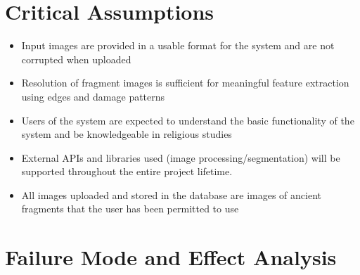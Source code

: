 \documentclass{article}
\begin{document}

\section{Critical Assumptions}

\begin{itemize}
    \item Input images are provided in a usable format for the system and are not corrupted when uploaded
    \item Resolution of fragment images is sufficient for meaningful feature extraction using edges and damage patterns
    \item Users of the system are expected to understand the basic functionality of the system and be knowledgeable in religious studies
    \item External APIs and libraries used (image processing/segmentation) will be supported throughout the entire project lifetime.
    \item All images uploaded and stored in the database are images of ancient fragments that the user has been permitted to use
\end{itemize}

\section{Failure Mode and Effect Analysis}
\end{document}
